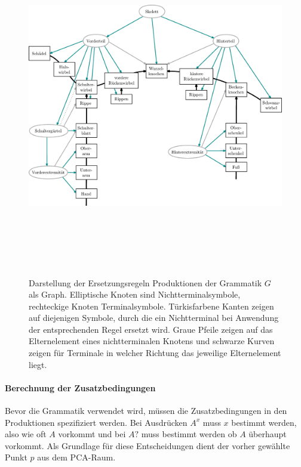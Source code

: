  
 \begin{figure}
  \centering
  \includegraphics[height=15cm, angle=90, origin=c]{graphics/grammarGraph}
  \caption{Darstellung der Ersetzungsregeln \bzw Produktionen der Grammatik $G$ als Graph. Elliptische Knoten sind Nichtterminalsymbole, rechteckige Knoten Terminalsymbole. Türkisfarbene Kanten zeigen auf diejenigen Symbole, durch die ein Nichtterminal bei Anwendung der entsprechenden Regel ersetzt wird. Graue Pfeile zeigen auf das Elternelement eines nichtterminalen Knotens und schwarze Kurven zeigen für Terminale in welcher Richtung das jeweilige Elternelement liegt.}
  \label{grammar_graph}
 \end{figure}
 
 
\paragraph{Berechnung der Zusatzbedingungen}

Bevor die Grammatik verwendet wird, müssen die Zusatzbedingungen in den Produktionen spezifiziert werden. Bei Ausdrücken $A^x$ muss $x$ bestimmt werden, also wie oft $A$ vorkommt und bei $A?$ muss bestimmt werden ob $A$ überhaupt vorkommt.
Als Grundlage für diese Entscheidungen dient der vorher gewählte Punkt $p$ aus dem PCA-Raum.

